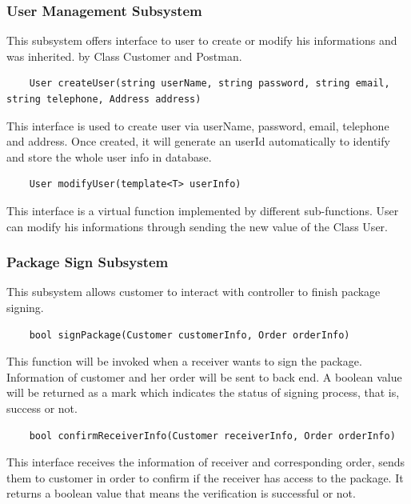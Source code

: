 \documentclass[12pt]{scrreprt}
\begin{document}
\subsubsection{User Management Subsystem}
This subsystem offers interface to user to create or modify his informations and was inherited. by Class Customer and Postman.
\begin{lstlisting}
	User createUser(string userName, string password, string email, string telephone, Address address)
\end{lstlisting}
This interface is used to create user via userName, password, email, telephone and address. Once created, it will generate an userId automatically to identify and store the whole user info in database.
\begin{lstlisting}
	User modifyUser(template<T> userInfo)
\end{lstlisting}
This interface is a virtual function implemented by different sub-functions. User can modify his informations through sending the new value of the Class User.

\subsubsection{Package Sign Subsystem}
This subsystem allows customer to interact with controller to finish package signing.
\begin{lstlisting}
	bool signPackage(Customer customerInfo, Order orderInfo)
\end{lstlisting}
This function will be invoked when a receiver wants to sign the package. Information of customer and her order will be sent to back end. A boolean value will be returned as a mark which indicates the status of signing process, that is, success or not.
\begin{lstlisting}
	bool confirmReceiverInfo(Customer receiverInfo, Order orderInfo)
\end{lstlisting}
This interface receives the information of receiver and corresponding order, sends them to customer in order to confirm if the receiver has access to the package. It returns a boolean value that means the verification is successful or not.
\end{document}
